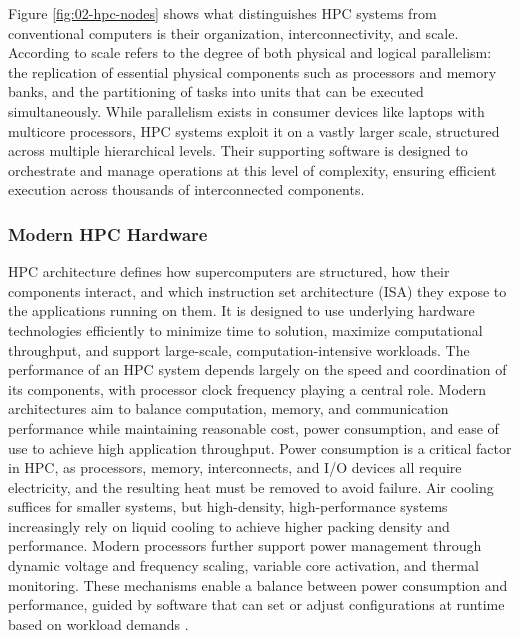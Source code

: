 Figure \ref{fig:02-hpc-nodes} shows what distinguishes HPC systems from conventional computers is their organization, interconnectivity, and scale. According to \cite{STERLING201843} scale refers to the degree of both physical and logical parallelism: the replication of essential physical components such as processors and memory banks, and the partitioning of tasks into units that can be executed simultaneously. While parallelism exists in consumer devices like laptops with multicore processors, HPC systems exploit it on a vastly larger scale, structured across multiple hierarchical levels. Their supporting software is designed to orchestrate and manage operations at this level of complexity, ensuring efficient execution across thousands of interconnected components.

\subsubsection{Modern HPC Hardware}
\label{sec:background_hpc_hardware}

HPC architecture defines how supercomputers are structured, how their components interact, and which instruction set architecture (ISA) they expose to the applications running on them. It is designed to use underlying hardware technologies efficiently to minimize time to solution, maximize computational throughput, and support large-scale, computation-intensive workloads.
The performance of an HPC system depends largely on the speed and coordination of its components, with processor clock frequency playing a central role. Modern architectures aim to balance computation, memory, and communication performance while maintaining reasonable cost, power consumption, and ease of use to achieve high application throughput.
Power consumption is a critical factor in HPC, as processors, memory, interconnects, and I/O devices all require electricity, and the resulting heat must be removed to avoid failure. Air cooling suffices for smaller systems, but high-density, high-performance systems increasingly rely on liquid cooling to achieve higher packing density and performance. Modern processors further support power management through dynamic voltage and frequency scaling, variable core activation, and thermal monitoring. These mechanisms enable a balance between power consumption and performance, guided by software that can set or adjust configurations at runtime based on workload demands \cite{STERLING201843}.

